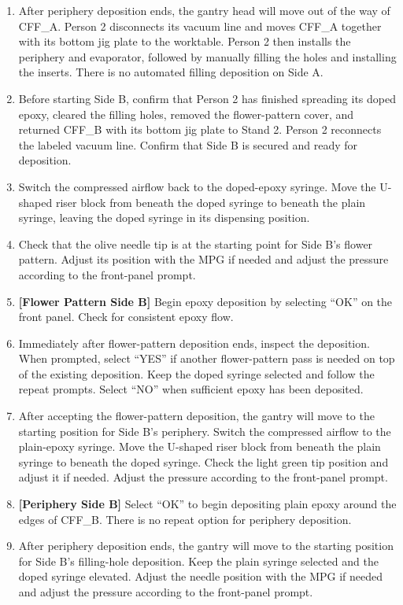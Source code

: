 \documentclass[12pt]{cornelltfpxsop}
\begin{document}
\begin{enumerate}
    \item After periphery deposition ends, the gantry head will move out of the way of CFF\_A. Person 2 disconnects its vacuum line and moves CFF\_A together with its bottom jig plate to the worktable. Person 2 then installs the periphery and evaporator, followed by manually filling the holes and installing the inserts. There is no automated filling deposition on Side A.
    \item Before starting Side B, confirm that Person 2 has finished spreading its doped epoxy, cleared the filling holes, removed the flower-pattern cover, and returned CFF\_B with its bottom jig plate to Stand 2. Person 2 reconnects the labeled vacuum line. Confirm that Side B is secured and ready for deposition.
    \item Switch the compressed airflow back to the doped-epoxy syringe. Move the U-shaped riser block from beneath the doped syringe to beneath the plain syringe, leaving the doped syringe in its dispensing position.
    \item Check that the olive needle tip is at the starting point for Side B's flower pattern. Adjust its position with the MPG if needed and adjust the pressure according to the front-panel prompt.
    \item \textbf{[Flower Pattern Side B]} Begin epoxy deposition by selecting ``OK'' on the front panel. Check for consistent epoxy flow.
    \item Immediately after flower-pattern deposition ends, inspect the deposition. When prompted, select ``YES'' if another flower-pattern pass is needed on top of the existing deposition. Keep the doped syringe selected and follow the repeat prompts. Select ``NO'' when sufficient epoxy has been deposited.
    \item After accepting the flower-pattern deposition, the gantry will move to the starting position for Side B's periphery. Switch the compressed airflow to the plain-epoxy syringe. Move the U-shaped riser block from beneath the plain syringe to beneath the doped syringe. Check the light green tip position and adjust it if needed. Adjust the pressure according to the front-panel prompt.
    \item \textbf{[Periphery Side B]} Select ``OK'' to begin depositing plain epoxy around the edges of CFF\_B. There is no repeat option for periphery deposition.
    \item After periphery deposition ends, the gantry will move to the starting position for Side B's filling-hole deposition. Keep the plain syringe selected and the doped syringe elevated. Adjust the needle position with the MPG if needed and adjust the pressure according to the front-panel prompt.

\end{enumerate}
\end{document}

